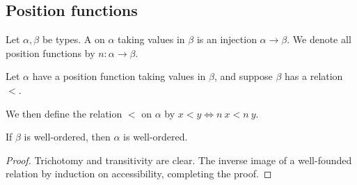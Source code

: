 \subsection{Position functions}

\begin{definition}
    Let \( \alpha, \beta \) be types.
    A  on \( \alpha \) taking values in \( \beta \) is an injection \( \alpha \to \beta \).
    We denote all position functions by \( n : \alpha \to \beta \).
\end{definition}
Let \( \alpha \) have a position function taking values in \( \beta \), and suppose \( \beta \) has a relation \( < \).
\begin{definition}
    We then define the relation \( < \) on \( \alpha \) by \( x < y \Leftrightarrow n\ x < n\ y \).
\end{definition}
\begin{lemma}
    If \( \beta \) is well-ordered, then \( \alpha \) is well-ordered.
\end{lemma}
\begin{proof}
    Trichotomy and transitivity are clear.
    The inverse image of a well-founded relation  by induction on accessibility, completing the proof.
\end{proof}

